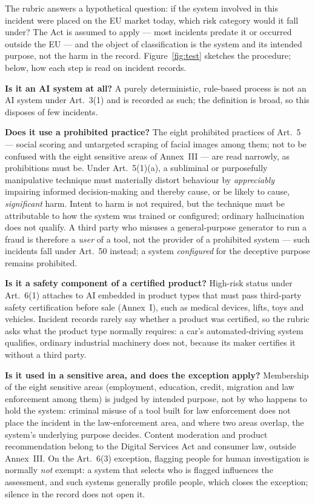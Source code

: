 \documentclass[sigconf,natbib=false, language=english]{acmart}
\begin{document}
The rubric answers a hypothetical question: if the system involved in this incident
were placed on the EU market today, which risk category would it fall under? The Act is
assumed to apply --- most incidents predate it or occurred outside the EU --- and the
object of classification is the system and its intended purpose, not the harm in the
record. Figure~\ref{fig:test} sketches the procedure; below, how each step is read on
incident records.

\textbf{Is it an AI system at all?} A purely deterministic, rule-based process is not
an AI system under Art.~3(1) and is recorded as such; the definition is broad, so this
disposes of few incidents.

\textbf{Does it use a prohibited practice?} The eight prohibited practices of Art.~5
--- social scoring and untargeted scraping of facial images among them; not to be
confused with the eight sensitive areas of Annex~III --- are read narrowly, as
prohibitions must be. Under Art.~5(1)(a), a subliminal or purposefully
manipulative technique must materially distort behaviour by \emph{appreciably}
impairing informed decision-making and thereby cause, or be likely to cause,
\emph{significant} harm. Intent to harm is not required, but the technique must be
attributable to how the system was trained or configured; ordinary hallucination does
not qualify. A third party who misuses a general-purpose
generator to run a fraud is therefore a \emph{user} of a tool, not the provider of a
prohibited system --- such incidents fall under Art.~50 instead; a system
\emph{configured} for the deceptive purpose remains prohibited.

\textbf{Is it a safety component of a certified product?} High-risk status under
Art.~6(1) attaches to AI embedded in product types that must pass third-party safety
certification before sale (Annex~I), such as medical devices, lifts, toys and
vehicles. Incident records rarely say whether a product was certified, so the rubric
asks what the product type normally requires: a car's automated-driving system
qualifies, ordinary industrial machinery does not, because its maker certifies it
without a third party.

\textbf{Is it used in a sensitive area, and does the exception apply?} Membership of
the eight sensitive areas (employment, education, credit, migration and law
enforcement among them) is judged by intended purpose, not by who happens to hold the
system: criminal misuse of a tool built for law enforcement does not place the incident
in the law-enforcement area, and where two areas overlap, the system's underlying
purpose decides. Content moderation and product recommendation belong to the
Digital Services Act and consumer law, outside Annex~III. On the Art.~6(3) exception,
flagging people for human investigation is normally \emph{not} exempt: a system that
selects who is flagged influences the assessment, and such systems generally profile
people, which closes the exception; silence in the record does not open it.
\end{document}
